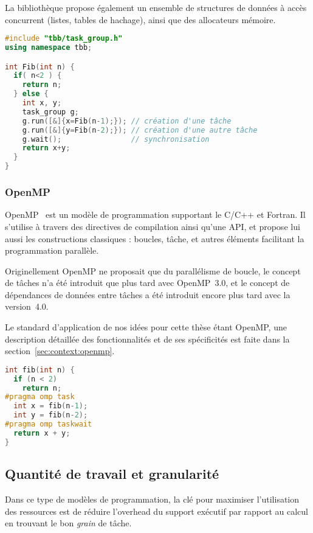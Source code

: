 La bibliothèque propose également un ensemble de structures de données à accès concurrent (listes, tables de hachage), ainsi que des allocateurs mémoire.

\begin{lstlisting}[language=c++,caption=Fibonacci exprimé en TBB,label=lst:context:tbb]
#include "tbb/task_group.h"
using namespace tbb;

int Fib(int n) {
  if( n<2 ) {
    return n;
  } else {
    int x, y;
    task_group g;
    g.run([&]{x=Fib(n-1);}); // création d'une tâche
    g.run([&]{y=Fib(n-2);}); // création d'une autre tâche
    g.wait();                // synchronisation
    return x+y;
  }
}
\end{lstlisting}

\subsubsection{OpenMP}

OpenMP~\cite{openmp45} est un modèle de programmation supportant le C/C++ et Fortran.
Il s'utilise à travers des directives de compilation ainsi qu'une API, et propose lui aussi les constructions classiques : boucles, tâche, et autres éléments facilitant la programmation parallèle.

Originellement OpenMP ne proposait que du parallélisme de boucle, le concept de tâches n'a été introduit que plus tard avec OpenMP~3.0, et le concept de dépendances de données entre tâches a été introduit encore plus tard avec la version~4.0.

Le standard d'application de nos idées pour cette thèse étant OpenMP, une description détaillée des fonctionnalités et de ses spécificités est faite dans la section~\ref{sec:context:openmp}.

\begin{lstlisting}[language=c++,caption=Fibonacci exprimé en OpenMP,label=lst:context:openmp]
int fib(int n) {
  if (n < 2)
    return n;
#pragma omp task
  int x = fib(n-1);
  int y = fib(n-2);
#pragma omp taskwait
  return x + y;
}
\end{lstlisting}

\subsection{Quantité de travail et granularité}\label{sec:context:others:granularity}


Dans ce type de modèles de programmation, la clé pour maximiser l'utilisation des ressources est de réduire l'overhead du support exécutif par rapport au calcul en trouvant le bon \emph{grain} de tâche.

